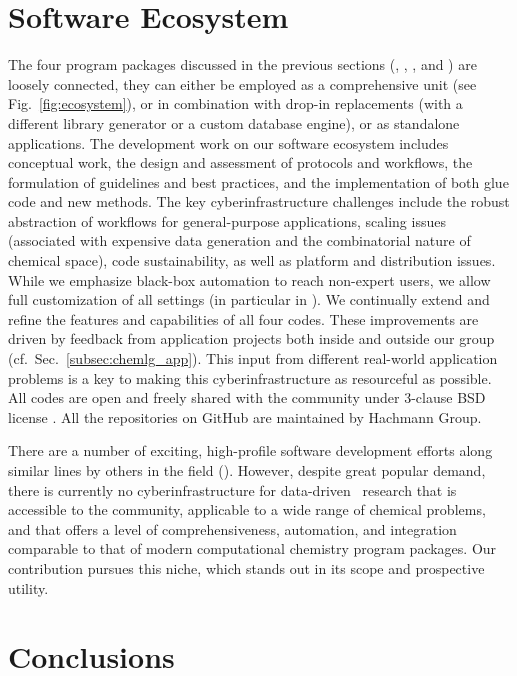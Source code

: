 \section{Software Ecosystem}
\label{subsec:ecosystem}
The four program packages discussed in the previous sections (\chemlg, \chemhtps, \chembddb, and \chemml) are loosely connected, \ie  they can either be employed as a comprehensive unit (see Fig.\ \ref{fig:ecosystem}), or in combination with drop-in replacements (\eg  with a different library generator or a custom database engine), or as standalone applications. 
The development work on our software ecosystem includes conceptual work, the design and assessment of protocols and workflows, the formulation of guidelines and best practices, and the implementation of both glue code and new methods. 
The key cyberinfrastructure challenges include the robust abstraction of workflows for general-purpose applications, scaling issues (\eg  associated with expensive data generation and the combinatorial nature of chemical space), code sustainability, as well as platform and distribution issues. While we emphasize black-box automation to reach non-expert users, we allow full customization of all settings (in particular in \chemml ). We continually extend and refine the features and capabilities of all four codes. These improvements are driven by feedback from application projects both inside and outside our group (cf.\ Sec.\ \ref{subsec:chemlg_app}). This input from different real-world application problems is a key to making this cyberinfrastructure as resourceful as possible. All codes are open and freely shared with the community under 3-clause BSD license \cite{Afzal2018b,Afzal2018c,Shirish2018,Haghighatlari2017}. All the repositories on GitHub are maintained by Hachmann Group. 

There are a number of exciting, high-profile software development efforts along similar lines by others in the field (\eg  \cite{Gunter2012,Ward2016}). 
However, despite great popular demand, there is currently no cyberinfrastructure for data-driven \insilico\ research that is accessible to the community, applicable to a wide range of chemical problems, and that offers a level of comprehensiveness, automation, and integration comparable to that of modern computational chemistry program packages. Our contribution pursues this niche, which stands out in its scope and prospective utility.    

\section{Conclusions}

